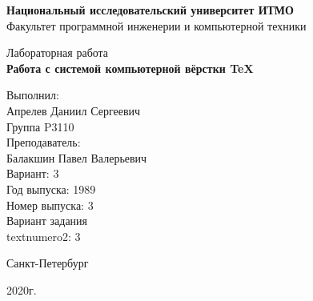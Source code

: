 \thispagestyle{empty}
\begin{center}
    {\bfseries Национальный исследовательский университет ИТМО}\\
    Факультет программной инженерии и компьютерной техники

    \vspace{30em}

    {\large Лабораторная работа }\\
    {\Large \textbf{Работа с системой компьютерной вёрстки \TeX}}
\end{center}

\vspace{20em}

\begin{flushright}
    Выполнил:\\
    Апрелев Даниил Сергеевич\\
    Группа P3110\\
    Преподаватель:\\
    Балакшин Павел Валерьевич\\
    Вариант: 3\\
    Год выпуска: 1989\\
    Номер выпуска: 3 \\
    Вариант задания \\textnumero2: 3 
\end{flushright}

\vspace{\fill}

\begin{center}
Санкт-Петербург

2020г.
\end{center}